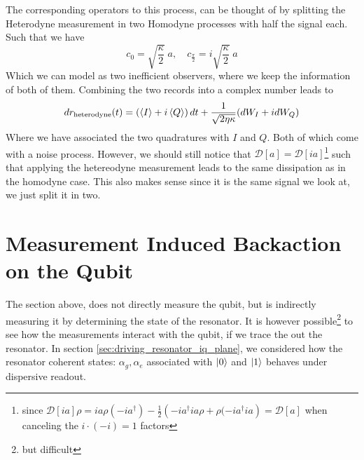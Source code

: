 The corresponding operators to this process, can be thought of by splitting the Heterodyne measurement in two Homodyne processes with half the signal each. Such that we have
\begin{equation}
    c_0 = \sqrt{\frac{\kappa}{2}}\; a, \quad c_{\frac{\pi}{2}} = i \sqrt{\frac{\kappa}{2}} \; a
\end{equation}
Which we can model as two inefficient observers, where we keep the information of both of them. Combining the two records into a complex number leads to
\begin{equation}
    dr_{\text{heterodyne}}(t) = \left(\expval{I} + i\expval{Q}\right)dt  + \frac{1}{\sqrt{2\eta\kappa}}(dW_I + i dW_Q)
\end{equation}
Where we have associated the two quadratures with $I$ and $Q$. Both of which come with a noise process. However, we should still notice that $\mathcal{D}[a] = \mathcal{D}[ia]$\footnote{since $\mathcal{D}[ia] \rho = ia\rho (-ia^\dagger) - \frac12 \left(-ia^\dagger ia \rho + \rho (-ia^\dagger ia\right) = \mathcal{D}[a]$ when canceling the $i \cdot (-i) = 1$ factors} such that applying the hetereodyne measurement leads to the same dissipation as in the homodyne case. This also makes sense since it is the same signal we look at, we just split it in two. 



\section{Measurement Induced Backaction on the Qubit}\label{sec:qubit_backaction}
The section above, does not directly measure the qubit, but is indirectly measuring it by determining the state of the resonator. It is however possible\footnote{but difficult} to see how the measurements interact with the qubit, if we trace the out the resonator. In section \ref{sec:driving_resonator_iq_plane}, we considered how the resonator coherent states: $\alpha_g, \alpha_e$ associated with $\ket{0}$ and $\ket{1}$ behaves under dispersive readout. 

